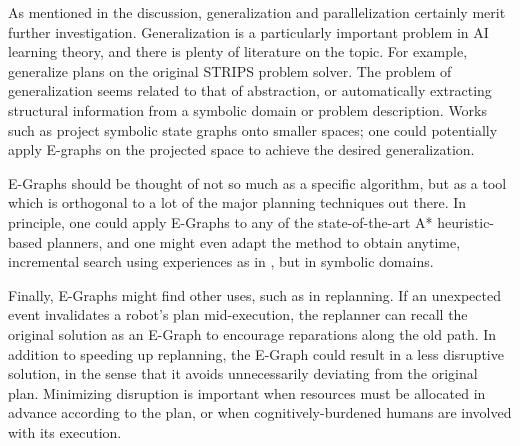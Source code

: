\documentclass[letterpaper]{article}
\begin{document}
As mentioned in the discussion, generalization and parallelization certainly merit further investigation. Generalization is a particularly important problem in AI learning theory, and there is plenty of literature on the topic. For example, \cite{fikes1972learning} generalize plans on the original STRIPS problem solver. The problem of generalization seems related to that of abstraction, or automatically extracting structural information from a symbolic domain or problem description. Works such as \cite{helmert2007flexible} project symbolic state graphs onto smaller spaces; one could potentially apply E-graphs on the projected space to achieve the desired generalization.

E-Graphs should be thought of not so much as a specific algorithm, but as a tool which is orthogonal to a lot of the major planning techniques out there. In principle, one could apply E-Graphs to any of the state-of-the-art A* heuristic-based planners, and one might even adapt the method to obtain anytime, incremental search using experiences as in \cite{phillips2013anytime}, but in symbolic domains.

Finally, E-Graphs might find other uses, such as in replanning. If an unexpected event invalidates a robot's plan mid-execution, the replanner can recall the original solution as an E-Graph to encourage reparations along the old path. In addition to speeding up replanning, the E-Graph could result in a less disruptive solution, in the sense that it avoids unnecessarily deviating from the original plan. Minimizing disruption is important when resources must be allocated in advance according to the plan, or when cognitively-burdened humans are involved with its execution.



\end{document}
